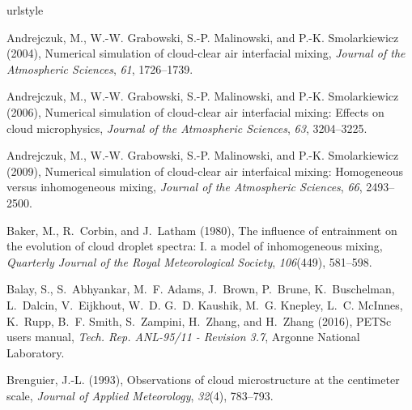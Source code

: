 \documentclass[draft,linenumbers]{AGUJournal}
\begin{document}
%
%
\begin{thebibliography}{60}
\providecommand{\natexlab}[1]{#1}
\expandafter\ifx\csname urlstyle\endcsname\relax
  \providecommand{\doi}[1]{doi:\discretionary{}{}{}#1}\else
  \providecommand{\doi}{doi:\discretionary{}{}{}\begingroup
  \urlstyle{rm}\Url}\fi

Andrejczuk, M., W.-W. Grabowski, S.-P. Malinowski, and P.-K. Smolarkiewicz
  (2004), Numerical simulation of cloud-clear air interfacial mixing,
  \textit{Journal of the Atmospheric Sciences}, \textit{61}, 1726--1739.

Andrejczuk, M., W.-W. Grabowski, S.-P. Malinowski, and P.-K. Smolarkiewicz
  (2006), Numerical simulation of cloud-clear air interfacial mixing: Effects
  on cloud microphysics, \textit{Journal of the Atmospheric Sciences},
  \textit{63}, 3204--3225.

Andrejczuk, M., W.-W. Grabowski, S.-P. Malinowski, and P.-K. Smolarkiewicz
  (2009), Numerical simulation of cloud-clear air interfaical mixing:
  Homogeneous versus inhomogeneous mixing, \textit{Journal of the Atmospheric
  Sciences}, \textit{66}, 2493--2500.

Baker, M., R.~Corbin, and J.~Latham (1980), The influence of entrainment on the
  evolution of cloud droplet spectra: I. a model of inhomogeneous mixing,
  \textit{Quarterly Journal of the Royal Meteorological Society},
  \textit{106}(449), 581--598.

Balay, S., S.~Abhyankar, M.~F. Adams, J.~Brown, P.~Brune, K.~Buschelman,
  L.~Dalcin, V.~Eijkhout, W.~D. G.~D. Kaushik, M.~G. Knepley, L.~C. McInnes,
  K.~Rupp, B.~F. Smith, S.~Zampini, H.~Zhang, and H.~Zhang (2016), {PETS}c
  users manual, \textit{Tech. Rep. ANL-95/11 - Revision 3.7}, Argonne National
  Laboratory.

Brenguier, J.-L. (1993), Observations of cloud microstructure at the centimeter
  scale, \textit{Journal of Applied Meteorology}, \textit{32}(4), 783--793.


\end{thebibliography}
\end{document}
